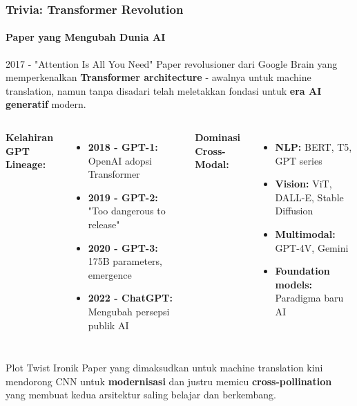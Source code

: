 \documentclass[t,aspectratio=169,xcolor=dvipsnames]{beamer}
\begin{document}
\begin{frame}
    \frametitle{Trivia: Transformer Revolution}
    \framesubtitle{Paper yang Mengubah Dunia AI}
    \scriptsize

    \begin{exampleblock}{2017 - "Attention Is All You Need"}
        Paper revolusioner dari Google Brain yang memperkenalkan \textbf{Transformer architecture} - awalnya untuk machine translation, namun tanpa disadari telah meletakkan fondasi untuk \textbf{era AI generatif} modern.
    \end{exampleblock}

    \begin{columns}[t]
        \textbf{Kelahiran GPT Lineage:}
        \begin{itemize}
            \item \textbf{2018 - GPT-1:} OpenAI adopsi Transformer
            \item \textbf{2019 - GPT-2:} "Too dangerous to release"
            \item \textbf{2020 - GPT-3:} 175B parameters, emergence
            \item \textbf{2022 - ChatGPT:} Mengubah persepsi publik AI
        \end{itemize}

        \textbf{Dominasi Cross-Modal:}
        \begin{itemize}
            \item \textbf{NLP:} BERT, T5, GPT series
            \item \textbf{Vision:} ViT, DALL-E, Stable Diffusion
            \item \textbf{Multimodal:} GPT-4V, Gemini
            \item \textbf{Foundation models:} Paradigma baru AI
        \end{itemize}
    \end{columns}

    \begin{alertblock}{Plot Twist Ironik}
        Paper yang dimaksudkan untuk machine translation kini mendorong CNN untuk \textbf{modernisasi} dan justru memicu \textbf{cross-pollination} yang membuat kedua arsitektur saling belajar dan berkembang.
    \end{alertblock}
\end{frame}
\end{document}
